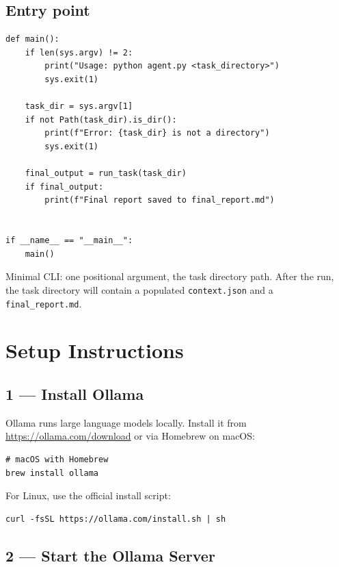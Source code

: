 \documentclass[12pt, a4paper]{article}
\begin{document}
\subsection{Entry point}

\begin{lstlisting}[style=pythonstyle]
def main():
    if len(sys.argv) != 2:
        print("Usage: python agent.py <task_directory>")
        sys.exit(1)

    task_dir = sys.argv[1]
    if not Path(task_dir).is_dir():
        print(f"Error: {task_dir} is not a directory")
        sys.exit(1)

    final_output = run_task(task_dir)
    if final_output:
        print(f"Final report saved to final_report.md")


if __name__ == "__main__":
    main()
\end{lstlisting}

Minimal CLI: one positional argument, the task directory path. After the run, the task directory will contain a populated \texttt{context.json} and a \texttt{final\_report.md}.

\clearpage
\section{Setup Instructions}
\label{appendix:quickstart}
\subsection{1 — Install Ollama}

Ollama runs large language models locally. Install it from \url{https://ollama.com/download} or via Homebrew on macOS:

\begin{lstlisting}[style=shellstyle]
# macOS with Homebrew
brew install ollama
\end{lstlisting}

For Linux, use the official install script:

\begin{lstlisting}[style=shellstyle]
curl -fsSL https://ollama.com/install.sh | sh
\end{lstlisting}

\subsection{2 — Start the Ollama Server}
\end{document}

